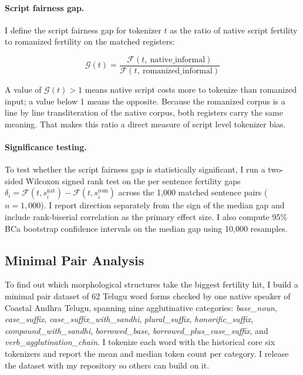 ﻿\documentclass[11pt]{article}
\begin{document}
\paragraph{Script fairness gap.}
I define the script fairness gap for tokenizer $t$ as the ratio of
native script fertility to romanized fertility on the matched
registers:

\begin{equation}
    \mathcal{G}(t) =
        \frac{\mathcal{F}(t,\ \mathrm{native\_informal})}
             {\mathcal{F}(t,\ \mathrm{romanized\_informal})}
    \label{eq:gap}
\end{equation}

A value of $\mathcal{G}(t) > 1$ means native script costs more to
tokenize than romanized input; a value below 1 means the opposite.
Because the romanized corpus is a line by line transliteration of
the native corpus, both registers carry the same meaning. That
makes this ratio a direct measure of script level tokenizer bias.

\paragraph{Significance testing.}
To test whether the script fairness gap is statistically
significant, I run a two-sided Wilcoxon signed rank test
\citep{wilcoxon-1945} on the per sentence fertility gaps
$\delta_i = \mathcal{F}(t, s_i^{\mathrm{nat}})
- \mathcal{F}(t, s_i^{\mathrm{rom}})$ across the 1,000 matched
sentence pairs ($n = 1{,}000$). I report direction separately from
the sign of the median gap and include rank-biserial correlation as
the primary effect size. I also compute 95\% BCa bootstrap
confidence intervals on the median gap using 10,000 resamples.

\subsection{Minimal Pair Analysis}

To find out which morphological structures take the biggest
fertility hit, I build a minimal pair dataset of 62 Telugu word
forms checked by one native speaker of Coastal Andhra Telugu,
spanning nine agglutinative categories: \textit{base\_noun}, \textit{case\_suffix},
\textit{case\_suffix\_with\_sandhi}, \textit{plural\_suffix},
\textit{honorific\_suffix}, \textit{compound\_with\_sandhi},
\textit{borrowed\_base}, \textit{borrowed\_plus\_case\_suffix}, and
\textit{verb\_agglutination\_chain}. I tokenize each word with the historical core six tokenizers and report the mean and median token count per
category. I release the dataset with my repository so others can
build on it.
\end{document}
